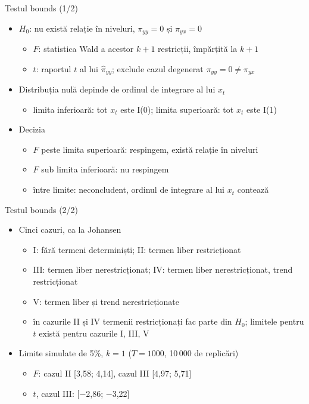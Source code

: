 \begin{frame}{Testul bounds (1/2)}
\itemsize{\small}
\begin{itemize}
    \item $H_0$: nu există relație în niveluri, $\pi_{yy} = 0$ și $\pi_{yx} = 0$
    \begin{itemize}
        \item $F$: statistica Wald a acestor $k + 1$ restricții, împărțită la $k + 1$
        \item $t$: raportul $t$ al lui $\hat\pi_{yy}$; exclude cazul degenerat $\pi_{yy} = 0 \ne \pi_{yx}$
    \end{itemize}
    \item Distribuția nulă depinde de ordinul de integrare al lui $x_t$
    \begin{itemize}
        \item limita inferioară: tot $x_t$ este I(0); limita superioară: tot $x_t$ este I(1)
    \end{itemize}
    \item Decizia
    \begin{itemize}
        \item $F$ peste limita superioară: respingem, există relație în niveluri
        \item $F$ sub limita inferioară: nu respingem
        \item între limite: neconcludent, ordinul de integrare al lui $x_t$ contează
    \end{itemize}
\end{itemize}
\end{frame}

\begin{frame}{Testul bounds (2/2)}
\itemsize{\small}
\begin{itemize}
    \item Cinci cazuri, ca la Johansen
    \begin{itemize}
        \item I: fără termeni determiniști; II: termen liber restricționat
        \item III: termen liber nerestricționat; IV: termen liber nerestricționat, trend restricționat
        \item V: termen liber și trend nerestricționate
        \item în cazurile II și IV termenii restricționați fac parte din $H_0$; limitele pentru $t$ există pentru cazurile I, III, V
    \end{itemize}
    \item Limite simulate de 5\%, $k = 1$ ($T = 1000$, 10\,000 de replicări)
    \begin{itemize}
        \item $F$: cazul II [3{,}58; 4{,}14], cazul III [4{,}97; 5{,}71]
        \item $t$, cazul III: [\ensuremath{-}2{,}86; \ensuremath{-}3{,}22]
    \end{itemize}
\end{itemize}
\end{frame}

